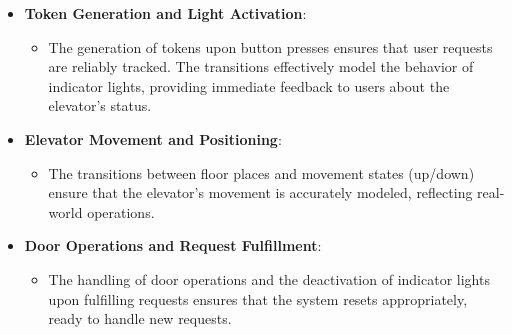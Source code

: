 \documentclass[12pt	]{article}
\begin{document}
\begin{itemize}
	\item \textbf{Token Generation and Light Activation}:
	\begin{itemize}
		\item The generation of tokens upon button presses ensures that user requests are reliably tracked. The transitions effectively model the behavior of indicator lights, providing immediate feedback to users about the elevator's status.
	\end{itemize}
	\item \textbf{Elevator Movement and Positioning}:
	\begin{itemize}
		\item The transitions between floor places and movement states (up/down) ensure that the elevator's movement is accurately modeled, reflecting real-world operations.
	\end{itemize}
	\item \textbf{Door Operations and Request Fulfillment}:
	\begin{itemize}
		\item The handling of door operations and the deactivation of indicator lights upon fulfilling requests ensures that the system resets appropriately, ready to handle new requests.
	\end{itemize}
\end{itemize}



\newpage
\end{document}
